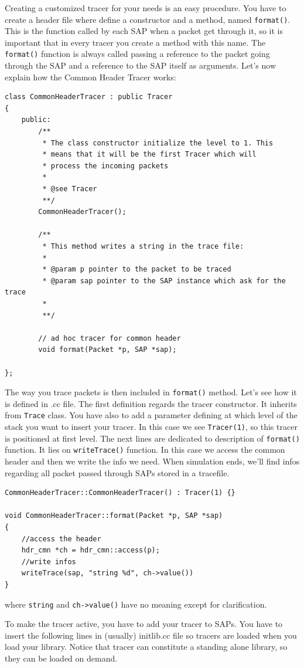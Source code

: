 \documentclass[a4paper,10pt]{article}
\begin{document}
Creating a customized tracer for your needs is an easy procedure. You have to create a header file where define a constructor and a method, named \verb=format()=. This is the function called by each SAP when a packet get through it, so it is important that in every tracer you create a method with this name. The \verb=format()= function is always called passing a reference to the packet going through the SAP and a reference to the SAP itself as arguments.
Let's now explain how the Common Header Tracer works:
\begin{verbatim}
class CommonHeaderTracer : public Tracer
{
	public:
		/**
		 * The class constructor initialize the level to 1. This
		 * means that it will be the first Tracer which will 
		 * process the incoming packets
		 * 
		 * @see Tracer
		 **/
		CommonHeaderTracer();
		
		/**
		 * This method writes a string in the trace file:
		 *
		 * @param p pointer to the packet to be traced
		 * @param sap pointer to the SAP instance which ask for the trace
		 * 
		 **/

		// ad hoc tracer for common header
		void format(Packet *p, SAP *sap);

};
\end{verbatim}

The way you trace packets is then included in \verb=format()= method. Let's see how it is defined in .cc file. The first definition regards the tracer constructor. It inherits from \verb=Trace= class. You have also to add a parameter defining at which level of the stack you want to insert your tracer. In this case we see \verb=Tracer(1)=, so this tracer is positioned at first level. The next lines are dedicated to description of \verb=format()= function. It lies on \verb=writeTrace()= function. In this case we access the common header and then we write the info we need. When simulation ends, we'll find infos regarding all packet passed through SAPs stored in a tracefile.
\begin{verbatim}
CommonHeaderTracer::CommonHeaderTracer() : Tracer(1) {}

void CommonHeaderTracer::format(Packet *p, SAP *sap)
{
	//access the header
	hdr_cmn *ch = hdr_cmn::access(p);
	//write infos
	writeTrace(sap, "string %d", ch->value())
}
\end{verbatim}
where \verb=string= and \verb=ch->value()= have no meaning except for clarification.

To make the tracer active, you have to add your tracer to SAPs. You have to insert the following lines in (usually) initlib.cc file so tracers are loaded when you load your library. Notice that tracer can constitute a standing alone library, so they can be loaded on demand.
\end{document}
